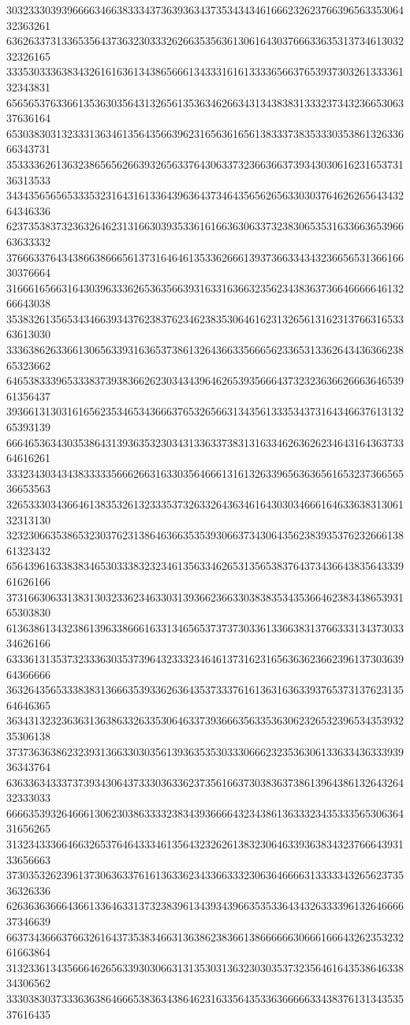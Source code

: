 30323330393966663466383334373639363437353434346166623262376639656335306432363261
63626337313365356437363230333262663535636130616430376663363531373461303232326165
33353033363834326161636134386566613433316161333365663765393730326133336132343831
65656537633661353630356431326561353634626634313438383133323734323665306337636164
65303830313233313634613564356639623165636165613833373835333035386132633666343731
35333362613632386565626639326563376430633732366366373934303061623165373136313533
34343565656533353231643161336439636437346435656265633030376462626564343264346336
62373538373236326462313166303935336161663630633732383065353163366365396663633332
37666337643438663866656137316464613533626661393736633434323665653136616630376664
31666165663164303963336265363566393163316366323562343836373664666664613266643038
35383261356534346639343762383762346238353064616231326561316231376631653363613030
33363862633661306563393163653738613264366335666562336531336264343636623865323662
64653833396533383739383662623034343964626539356664373232363662666364653961356437
39366131303161656235346534366637653265663134356133353437316434663761313265393139
66646536343035386431393635323034313363373831316334626362623464316436373364616261
33323430343438333335666266316330356466613161326339656363656165323736656536653563
32653330343664613835326132333537326332643634616430303466616463363831306132313130
32323066353865323037623138646366353539306637343064356238393537623266613861323432
65643961633838346530333832323461356334626531356538376437343664383564333961626166
37316630633138313032336234633031393662366330383835343536646238343865393165303830
61363861343238613963386661633134656537373730336133663831376633313437303334626166
63336131353732333630353739643233323464613731623165636362366239613730363964366666
36326435653338383136663539336263643537333761613631636339376537313762313564646365
36343132323636313638633263353064633739366635633536306232653239653435393235306138
37373636386232393136633030356139363535303330666232353630613363343633393936343764
63633634333737393430643733303633623735616637303836373861396438613264326432333033
66663539326466613062303863333238343936666432343861363332343533356530636431656265
31323433366466326537646433346135643232626138323064633936383432376664393133656663
37303532623961373063633761613633623433663332306364666631333334326562373536326336
62636363666436613364633137323839613439343966353533643432633339613264666637346639
66373436663766326164373538346631363862383661386666663066616664326235323261663864
31323361343566646265633930306631313530313632303035373235646164353864633834306562
33303830373336363864666538363438646231633564353363666663343837613134353537616435
